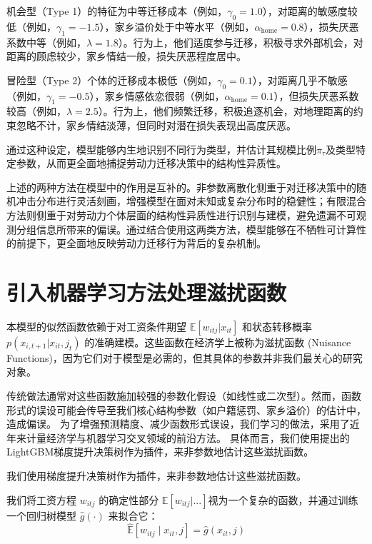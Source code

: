 \documentclass[
  a4paper,
  zihao=-4,
  fontset=mac,
  AutoFakeBold,
  AutoFakeSlant,
  oneside]{ctexbook}
\begin{document}
机会型（Type 1）的特征为中等迁移成本（例如，$\gamma_0 = 1.0$），对距离的敏感度较低（例如，$\gamma_1 = -1.5$），家乡溢价处于中等水平（例如，$\alpha_{\text{home}} = 0.8$），损失厌恶系数中等（例如，$\lambda = 1.8$）。行为上，他们适度参与迁移，积极寻求外部机会，对距离的顾虑较少，家乡情结一般，损失厌恶程度居中。

冒险型（Type 2）个体的迁移成本极低（例如，$\gamma_0 = 0.1$），对距离几乎不敏感（例如，$\gamma_1 = -0.5$），家乡情感依恋很弱（例如，$\alpha_{\text{home}} = 0.1$），但损失厌恶系数较高（例如，$\lambda = 2.5$）。行为上，他们频繁迁移，积极追逐机会，对地理距离的约束忽略不计，家乡情结淡薄，但同时对潜在损失表现出高度厌恶。

通过这种设定，模型能够内生地识别不同行为类型，并估计其规模比例$\pi_\tau$及类型特定参数，从而更全面地捕捉劳动力迁移决策中的结构性异质性。

上述的两种方法在模型中的作用是互补的。非参数离散化侧重于对迁移决策中的随机冲击分布进行灵活刻画，增强模型在面对未知或复杂分布时的稳健性；有限混合方法则侧重于对劳动力个体层面的结构性异质性进行识别与建模，避免遗漏不可观测分组信息所带来的偏误。通过结合使用这两类方法，模型能够在不牺牲可计算性的前提下，更全面地反映劳动力迁移行为背后的复杂机制。





\section{引入机器学习方法处理滋扰函数} 
\label{sec:ml_plugins}



本模型的似然函数依赖于对工资条件期望 $\mathbb{E}[w_{itj} | x_{it}]$ 和状态转移概率 $p(x_{i,t+1} | x_{it}, j_t)$ 的准确建模。这些函数在经济学上被称为滋扰函数 (Nuisance Functions)，因为它们对于模型是必需的，但其具体的参数并非我们最关心的研究对象。

传统做法通常对这些函数施加较强的参数化假设（如线性或二次型）。然而，函数形式的误设可能会传导至我们核心结构参数（如户籍惩罚、家乡溢价）的估计中，造成偏误。
为了增强预测精度、减少函数形式误设，我们学习\textcite{atheyGeneralizedRandomForests2019}的做法，采用了近年来计量经济学与机器学习交叉领域的前沿方法。
具体而言，我们使用\textcite{keLightGBMHighlyEfficient2017}提出的LightGBM梯度提升决策树作为插件，来非参数地估计这些滋扰函数。

我们使用梯度提升决策树作为插件，来非参数地估计这些滋扰函数。

我们将工资方程 $w_{itj}$ 的确定性部分 $\mathbb{E}[w_{itj} | ...] $视为一个复杂的函数，并通过训练一个回归树模型 $\hat{g}(\cdot)$ 来拟合它：
\begin{equation}
\hat{\mathbb{E}}[w_{itj} \mid x_{it}, j] = \hat{g}(x_{it}, j)
\end{equation}
\end{document}
